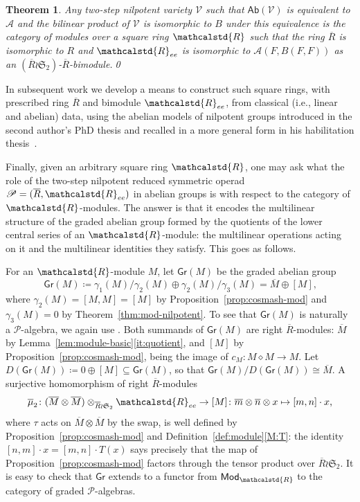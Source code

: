 \documentclass[reqno,a4paper]{amsart}
\theoremstyle{plain}
\newtheorem{theorem}[subsection]{Theorem}
\theoremstyle{definition}
\newcommand{\noproof}{\hfill\qed}
\newcommand{\DefEq}{\coloneq}
\newcommand{\V}{\ensuremath{\mathcal{V}}}
\newcommand{\A}{\ensuremath{\mathcal{A}}}
\newcommand{\R}{\ensuremath{\mathcalstd{R}}}
\newcommand{\Ab}{\ensuremath{\mathsf{Ab}}}
\newcommand{\Gr}{\ensuremath{\mathsf{Gr}}}
\newcommand{\Mod}{\ensuremath{\mathsf{Mod}}}
\renewcommand{\P}{\ensuremath{\mathcal{P}}}
\newcommand{\cosmash}{\ensuremath{\diamond}}
\newcommand{\cc}[1]{\ensuremath{c_{#1}}}                    %
\newcommand{\Ree}{\ensuremath{\R_{ee}}}
\newcommand{\Rbar}{\ensuremath{\overline{R}}}
\newcommand{\brk}[2]{\ensuremath{[#1,#2]}}
\begin{document}
\begin{theorem}\label{thm:classification}
  Any two-step nilpotent variety \(\V\) such that \(\Ab(\V)\) is equivalent to \(\A\) and the bilinear product of \(\V\) is isomorphic to \(B\) under this equivalence is the category of modules over a square ring \(\R\) such that the ring \(\Rbar\) is isomorphic to \(R\) and \(\Ree\) is isomorphic to \(\A(F,B(F,F))\) as an \((\Rbar\wr\mathfrak{S}_{2})\)-\(\Rbar\)-bimodule.\noproof
\end{theorem}

In subsequent work we develop a means to construct such square rings, with prescribed ring \(\Rbar\) and bimodule \(\Ree\), from classical (i.e., linear and abelian) data, using the abelian models of nilpotent groups introduced in the second author's PhD thesis \cite{Hartl-Diss} and recalled in a more general form in his habilitation thesis~\cite{Hartl-Habil}.

Finally, given an arbitrary square ring \(\R\), one may ask what the role of the two-step nilpotent reduced symmetric operad \(\P=(\Rbar,\Ree)\) in abelian groups is with respect to the category of \(\R\)-modules. The answer is that it encodes the multilinear structure of the graded abelian group formed by the quotients of the lower central series of an \(\R\)-module: the multilinear operations acting on it and the multilinear identities they satisfy. This goes as follows.

For an \(\R\)-module \(M\), let \(\Gr(M)\) be the graded abelian group
\[
  \Gr(M)\DefEq\gamma_{1}(M)/\gamma_{2}(M)\oplus\gamma_{2}(M)/\gamma_{3}(M)=\overline{M}\oplus[M]\text{,}
\]
where \(\gamma_{2}(M)=[M,M]=[M]\) by Proposition~\ref{prop:cosmash-mod} and \(\gamma_{3}(M)=0\) by Theorem~\ref{thm:mod-nilpotent}. To see that \(\Gr(M)\) is naturally a \(\P\)-algebra, we again use \cite[Remark~6.6]{DHVdL}. Both summands of \(\Gr(M)\) are right \(\Rbar\)-modules: \(\overline{M}\) by Lemma~\ref{lem:module-basic}\ref{it:quotient}, and \([M]\) by Proposition~\ref{prop:cosmash-mod}, being the image of \(\cc{M}\colon M\cosmash M\to M\). Let \(D(\Gr(M))\DefEq 0\oplus[M]\subseteq\Gr(M)\), so that \(\Gr(M)/D(\Gr(M))\cong\overline{M}\). A surjective homomorphism of right \(\Rbar\)-modules
\[
  \overline{\mu}_{2}\colon (\overline{M}\otimes\overline{M})\otimes_{\Rbar\wr\mathfrak{S}_{2}}\Ree\to[M]\colon \overline{m}\otimes\overline{n}\otimes x\mapsto\brk{m}{n}\cdot x\text{,}
\]
where \(\tau\) acts on \(\overline{M}\otimes\overline{M}\) by the swap, is well defined by Proposition~\ref{prop:cosmash-mod} and Definition~\ref{def:module}\ref{M:T}: the identity \(\brk{n}{m}\cdot x=\brk{m}{n}\cdot T(x)\) says precisely that the map of Proposition~\ref{prop:cosmash-mod} factors through the tensor product over \(\Rbar\wr\mathfrak{S}_{2}\). It is easy to check that \(\Gr\) extends to a functor from \(\Mod_{\R}\) to the category of graded \(\P\)-algebras.
\end{document}
